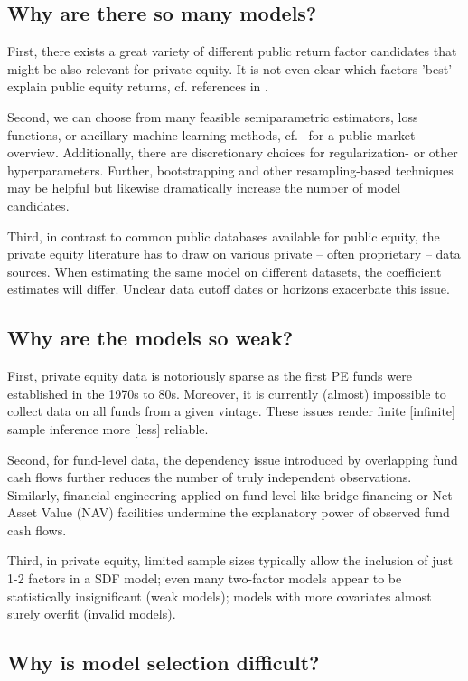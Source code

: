 \documentclass[12pt]{article}
\begin{document}
\subsection{Why are there so many models?}

First, there exists a great variety of different public return factor candidates that might be also relevant for private equity. 
It is not even clear which factors 'best' explain public equity returns, cf. references in \cite{KN20}. 

Second, we can choose from many feasible semiparametric estimators, loss functions, or ancillary machine learning methods, cf.\ \cite{GKX20} for a public market overview.
Additionally, there are discretionary choices for regularization- or other hyperparameters.
Further, bootstrapping and other resampling-based techniques may be helpful but likewise dramatically increase the number of model candidates.

Third, in contrast to common public databases available for public equity, the private equity literature has to draw on various private -- often proprietary -- data sources. 
When estimating the same model on different datasets, the coefficient estimates will differ. 
Unclear data cutoff dates or horizons exacerbate this issue.

\subsection{Why are the models so weak?}

First, private equity data is notoriously sparse as the first PE funds were established in the 1970s to 80s.
Moreover, it is currently (almost) impossible to collect data on all funds from a given vintage. 
These issues render finite [infinite] sample inference more [less] reliable.

Second, for fund-level data, the dependency issue introduced by overlapping fund cash flows further reduces the number of truly independent observations. 
Similarly, financial engineering applied on fund level like bridge financing or Net Asset Value (NAV) facilities undermine the explanatory power of observed fund cash flows.

Third, in private equity, limited sample sizes typically allow the inclusion of just 1-2 factors in a SDF model; 
even many two-factor models appear to be statistically insignificant (weak models); 
models with more covariates almost surely overfit (invalid models).


\subsection{Why is model selection difficult?}
\end{document}
